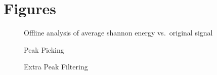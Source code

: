 \documentclass[titlepage]{scrartcl}
\begin{document}
\section{Figures}
\begin{figure}[H]
    \caption{Offline analysis of average shannon energy vs.\ original signal}
    \label{OfflineShanEngy}
\end{figure}
\begin{figure}[H]
    \caption{Peak Picking}
    \label{OfflinePeakPick}
\end{figure}
\begin{figure}[H]
    \caption{Extra Peak Filtering}
    \label{OfflinePeakFilter}
\end{figure}
\end{document}
